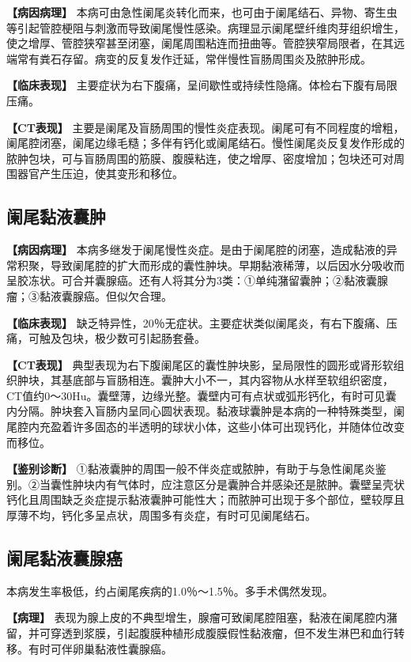 \textbf{【病因病理】}
本病可由急性阑尾炎转化而来，也可由于阑尾结石、异物、寄生虫等引起管腔梗阻与刺激而导致阑尾慢性感染。病理显示阑尾壁纤维肉芽组织增生，使之增厚、管腔狭窄甚至闭塞，阑尾周围粘连而扭曲等。管腔狭窄局限者，在其远端常有粪石存留。病变的反复发作迁延，常伴慢性盲肠周围炎及脓肿形成。

\textbf{【临床表现】}
主要症状为右下腹痛，呈间歇性或持续性隐痛。体检右下腹有局限压痛。

\textbf{【CT表现】}
主要是阑尾及盲肠周围的慢性炎症表现。阑尾可有不同程度的增粗，阑尾腔闭塞，阑尾边缘毛糙；多伴有钙化或阑尾结石。慢性阑尾炎反复发作形成的脓肿包块，可与盲肠周围的筋膜、腹膜粘连，使之增厚、密度增加；包块还可对周围器官产生压迫，使其变形和移位。

\subsection{阑尾黏液囊肿}

\textbf{【病因病理】}
本病多继发于阑尾慢性炎症。是由于阑尾腔的闭塞，造成黏液的异常积聚，导致阑尾腔的扩大而形成的囊性肿块。早期黏液稀薄，以后因水分吸收而呈胶冻状。可合并囊腺癌。还有人将其分为3类：①单纯潴留囊肿；②黏液囊腺瘤；③黏液囊腺癌。但似欠合理。

\textbf{【临床表现】}
缺乏特异性，20％无症状。主要症状类似阑尾炎，有右下腹痛、压痛，可触及包块，极少数可引起肠套叠。

\textbf{【CT表现】}
典型表现为右下腹阑尾区的囊性肿块影，呈局限性的圆形或肾形软组织肿块，其基底部与盲肠相连。囊肿大小不一，其内容物从水样至软组织密度，CT值约0～30Hu。囊壁薄，边缘光整。囊壁内可有点状或弧形钙化，有时可见囊内分隔。肿块套入盲肠内呈同心圆状表现。黏液球囊肿是本病的一种特殊类型，阑尾腔内充盈着许多固态的半透明的球状小体，这些小体可出现钙化，并随体位改变而移位。

\textbf{【鉴别诊断】}
①黏液囊肿的周围一般不伴炎症或脓肿，有助于与急性阑尾炎鉴别。②当囊性肿块内有气体时，应注意区分是囊肿合并感染还是脓肿。囊壁呈壳状钙化且周围缺乏炎症提示黏液囊肿可能性大；而脓肿可出现于多个部位，壁较厚且厚薄不均，钙化多呈点状，周围多有炎症，有时可见阑尾结石。

\subsection{阑尾黏液囊腺癌}

本病发生率极低，约占阑尾疾病的1.0％～1.5％。多手术偶然发现。

\textbf{【病理】}
表现为腺上皮的不典型增生，腺瘤可致阑尾腔阻塞，黏液在阑尾腔内潴留，并可穿透到浆膜，引起腹膜种植形成腹膜假性黏液瘤，但不发生淋巴和血行转移。有时可伴卵巢黏液性囊腺癌。


